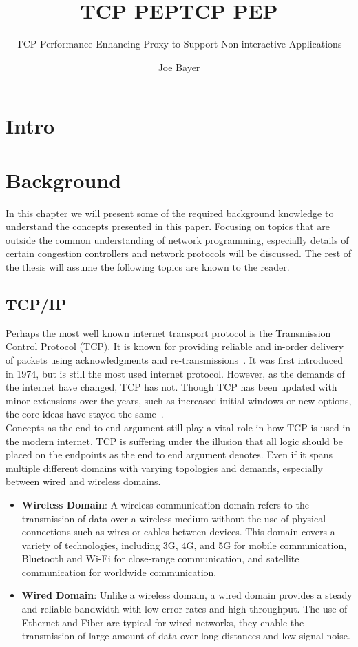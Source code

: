 \documentclass[a4paper,english, 11pt]{report}
\author{Joe Bayer}
\title{TCP PEP}
\subtitle{TCP Performance Enhancing Proxy to Support Non-interactive Applications}
\title{TCP PEP}
\begin{document}
 \uiomasterfp[program={Informatics: Programming and System Architecture}, supervisors={Michael Welzl\and Kristjon Ciko}]
\tableofcontents

\listoffigures

\chapter{Intro}

\chapter{Background}

In this chapter we will present some of the required background knowledge to understand the concepts presented in this paper. Focusing on topics that are outside the common understanding of network programming, especially details of certain congestion controllers and network protocols will be discussed. The rest of the thesis will assume the following topics are known to the reader. 

\section{TCP/IP}
Perhaps the most well known internet transport protocol is the Transmission Control Protocol (TCP). It is known for providing reliable and in-order delivery of packets using acknowledgments and re-transmissions~\cite{Eddy_2022}. It was first introduced in 1974, but is still the most used internet protocol. However, as the demands of the internet have changed, TCP has not. Though TCP has been updated with minor extensions over the years, such as increased initial windows or new options, the core ideas have stayed the same~\cite{rfc8803}.\\

Concepts as the end-to-end argument still play a vital role in how TCP is used in the modern internet. TCP is suffering under the illusion that all logic should be placed on the endpoints as the end to end argument denotes. Even if it spans multiple different domains with varying topologies and demands, especially between wired and wireless domains.
\begin{itemize}
  \item \textbf{Wireless Domain}: A wireless communication domain refers to the transmission of data over a wireless medium without the use of physical connections such as wires or cables between devices. This domain covers a variety of technologies, including 3G, 4G, and 5G for mobile communication, Bluetooth and Wi-Fi for close-range communication, and satellite communication for worldwide communication.
  \item \textbf{Wired Domain}: Unlike a wireless domain, a wired domain provides a steady and reliable bandwidth with low error rates and high throughput. The use of Ethernet and Fiber are typical for wired networks, they enable the transmission of large amount of data over long distances and low signal noise. 
\end{itemize}
\end{document}
